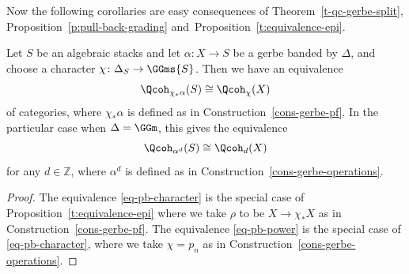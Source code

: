 Now the following corollaries are easy consequences of Theorem~\ref{t-qc-gerbe-split},
Proposition~\ref{p:pull-back-grading} and~Proposition~\ref{t:equivalence-epi}.
\begin{corollary}
\label{cor:twisted-power}
Let $S$ be an algebraic stacks and let $\alpha\colon X \to S$ be a gerbe banded by $\Delta$,
and choose a character $\chi\colon \Delta_S \to \GGms{S}$.
Then we have an equivalence
\begin{equation}
\label{eq-pb-character}
\Qcoh_{\chi_*\alpha}(S)\cong \Qcoh_\chi(X) 
\end{equation}
of categories, where $\chi_*\alpha$ is defined as in Construction~\ref{cons-gerbe-pf}.
In the particular case when $\Delta = \GGm$,
this gives the equivalence
\begin{equation}
\label{eq-pb-power}
\Qcoh_{\alpha^d}(S)\cong \Qcoh_{d}(X) 
\end{equation}
for any $d \in \mathbb{Z}$, where $\alpha^d$ is defined as in Construction~\ref{cons-gerbe-operations}.
\end{corollary}
\begin{proof}
The equivalence \eqref{eq-pb-character} is the special case of Proposition~\ref{t:equivalence-epi} where
we take $\rho$ to be $X \to \chi_* X$ as in Construction~\ref{cons-gerbe-pf}.
The equivalence \eqref{eq-pb-power} is the special case of \eqref{eq-pb-character},
where we take $\chi = p_n$ as in Construction~\ref{cons-gerbe-operations}.
\end{proof}

